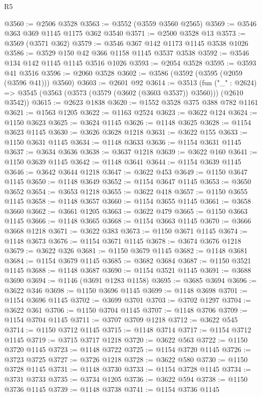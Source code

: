 \begin{lexlean}{R5}
\begin{coremodule}
@3560 := @2506 @3528
@3563 := @3552 (@3559 @3560 @2565)
@3569 := @3546 @363 @369 @1145 @1175 @362 @3540
@3571 := @2500 @3528 @13
@3573 := @3569 (@3571 @362)
@3579 := @3546 @367 @142 @1173 @1145 @3538 @1026
@3586 := @3529 @150 @42 @366 @1158 @1145 @3537 @3538
@3592 := @3546 @134 @142 @1145 @1145 @3516 @1026
@3593 := @2054 @3528
@3595 := @3593 @41 @3516
@3596 := @2060 @3528
@3602 := @3586 (@3592 (@3595 (@2059 (@3596 @41))) @3560)
@3603 := @2601 @92
@3614 := @3513
    (fun ("_" : @2624) => @3545 (@3563 (@3573 (@3579 (@3602 (@3603 @3537)) @3560))) (@2610 @3542))
@3615 := @2623 @1838
@3620 := @1552 @3528 @375 @388 @782 @1161
@3621 := @1563 @1205
@3622 := @1163 @2524
@3623 := @3622 @124
@3624 := @1150 @3623
@3625 := @3624 @1145
@3626 := @1148 @3625
@3628 := @1154 @3623 @1145
@3630 := @3626 @3628 @1218
@3631 := @3622 @155
@3633 := @1150 @3631 @1145
@3634 := @1148 @3633
@3636 := @1154 @3631 @1145
@3637 := @3634 @3636
@3638 := @3637 @1218
@3639 := @3622 @160
@3641 := @1150 @3639 @1145
@3642 := @1148 @3641
@3644 := @1154 @3639 @1145
@3646 := @3642 @3644 @1218
@3647 := @3622 @453
@3649 := @1150 @3647 @1145
@3650 := @1148 @3649
@3652 := @1154 @3647 @1145
@3653 := @3650 @3652
@3654 := @3653 @1218
@3655 := @3622 @418
@3657 := @1150 @3655 @1145
@3658 := @1148 @3657
@3660 := @1154 @3655 @1145
@3661 := @3658 @3660
@3662 := @3661 @1205
@3663 := @3622 @479
@3665 := @1150 @3663 @1145
@3666 := @1148 @3665
@3668 := @1154 @3663 @1145
@3670 := @3666 @3668 @1218
@3671 := @3622 @383
@3673 := @1150 @3671 @1145
@3674 := @1148 @3673
@3676 := @1154 @3671 @1145
@3678 := @3674 @3676 @1218
@3679 := @3622 @326
@3681 := @1150 @3679 @1145
@3682 := @1148 @3681
@3684 := @1154 @3679 @1145
@3685 := @3682 @3684
@3687 := @1150 @3521 @1145
@3688 := @1148 @3687
@3690 := @1154 @3521 @1145
@3691 := @3688 @3690
@3694 := @1146 (@3691 @1283 @1158)
@3695 := @3685 @3694
@3696 := @3622 @346
@3698 := @1150 @3696 @1145
@3699 := @1148 @3698
@3701 := @1154 @3696 @1145
@3702 := @3699 @3701
@3703 := @3702 @1297
@3704 := @3622 @361
@3706 := @1150 @3704 @1145
@3707 := @1148 @3706
@3709 := @1154 @3704 @1145
@3711 := @3707 @3709 @1218
@3712 := @3622 @545
@3714 := @1150 @3712 @1145
@3715 := @1148 @3714
@3717 := @1154 @3712 @1145
@3719 := @3715 @3717 @1218
@3720 := @3622 @563
@3722 := @1150 @3720 @1145
@3723 := @1148 @3722
@3725 := @1154 @3720 @1145
@3726 := @3723 @3725
@3727 := @3726 @1218
@3728 := @3622 @580
@3730 := @1150 @3728 @1145
@3731 := @1148 @3730
@3733 := @1154 @3728 @1145
@3734 := @3731 @3733
@3735 := @3734 @1205
@3736 := @3622 @594
@3738 := @1150 @3736 @1145
@3739 := @1148 @3738
@3741 := @1154 @3736 @1145

\end{coremodule}
\end{lexlean}
